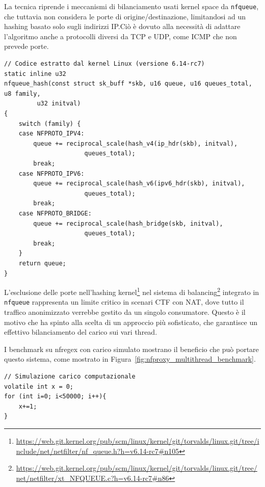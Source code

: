La tecnica riprende i meccanismi di bilanciamento usati kernel space da \texttt{nfqueue}, che tuttavia non considera le porte di origine/destinazione,
limitandosi ad un hashing basato solo sugli indirizzi IP.\@ Ciò è dovuto alla necessità di adattare l'algoritmo anche a protocolli diversi da TCP e UDP, come ICMP che non prevede porte.

\begin{listing}[H]
\begin{verbatim}
// Codice estratto dal kernel Linux (versione 6.14-rc7)
static inline u32
nfqueue_hash(const struct sk_buff *skb, u16 queue, u16 queues_total, u8 family,
	     u32 initval)
{
	switch (family) {
	case NFPROTO_IPV4:
		queue += reciprocal_scale(hash_v4(ip_hdr(skb), initval),
					  queues_total);
		break;
	case NFPROTO_IPV6:
		queue += reciprocal_scale(hash_v6(ipv6_hdr(skb), initval),
					  queues_total);
		break;
	case NFPROTO_BRIDGE:
		queue += reciprocal_scale(hash_bridge(skb, initval),
					  queues_total);
		break;
	}
	return queue;
}
\end{verbatim}
\end{listing}

L'esclusione delle porte nell'hashing kernel\footnote{\url{https://web.git.kernel.org/pub/scm/linux/kernel/git/torvalds/linux.git/tree/include/net/netfilter/nf_queue.h?h=v6.14-rc7\#n105}}
nel sistema di balancing\footnote{\url{https://web.git.kernel.org/pub/scm/linux/kernel/git/torvalds/linux.git/tree/net/netfilter/xt_NFQUEUE.c?h=v6.14-rc7\#n86}} integrato in \texttt{nfqueue}
rappresenta un limite critico in scenari CTF con NAT, dove tutto il traffico anonimizzato verrebbe gestito da un singolo consumatore.
Questo è il motivo che ha spinto alla scelta di un approccio più sofisticato, che garantisce un effettivo bilanciamento del carico sui vari thread.

I benchmark su nfregex con carico simulato mostrano il beneficio che può portare questo sistema, come mostrato in Figura~\ref{fig:nfproxy_multithread_benchmark}.

\begin{listing}[H]
\begin{verbatim}
// Simulazione carico computazionale
volatile int x = 0;
for (int i=0; i<50000; i++){
    x+=1;
}
\end{verbatim}
\end{listing}

